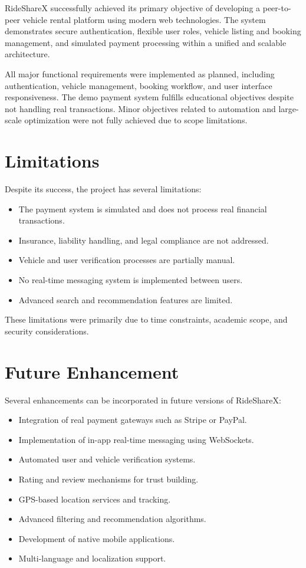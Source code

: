 \documentclass[12pt,a4paper]{report}
\begin{document}
RideShareX successfully achieved its primary objective of developing a peer-to-peer vehicle rental platform using modern web technologies. The system demonstrates secure authentication, flexible user roles, vehicle listing and booking management, and simulated payment processing within a unified and scalable architecture.

All major functional requirements were implemented as planned, including authentication, vehicle management, booking workflow, and user interface responsiveness. The demo payment system fulfills educational objectives despite not handling real transactions. Minor objectives related to automation and large-scale optimization were not fully achieved due to scope limitations.

\section{Limitations}

Despite its success, the project has several limitations:

\begin{itemize}
	\item The payment system is simulated and does not process real financial transactions.
	\item Insurance, liability handling, and legal compliance are not addressed.
	\item Vehicle and user verification processes are partially manual.
	\item No real-time messaging system is implemented between users.
	\item Advanced search and recommendation features are limited.
\end{itemize}

These limitations were primarily due to time constraints, academic scope, and security considerations.

\section{Future Enhancement}

Several enhancements can be incorporated in future versions of RideShareX:

\begin{itemize}
	\item Integration of real payment gateways such as Stripe or PayPal.
	\item Implementation of in-app real-time messaging using WebSockets.
	\item Automated user and vehicle verification systems.
	\item Rating and review mechanisms for trust building.
	\item GPS-based location services and tracking.
	\item Advanced filtering and recommendation algorithms.
	\item Development of native mobile applications.
	\item Multi-language and localization support.
\end{itemize}
\end{document}
